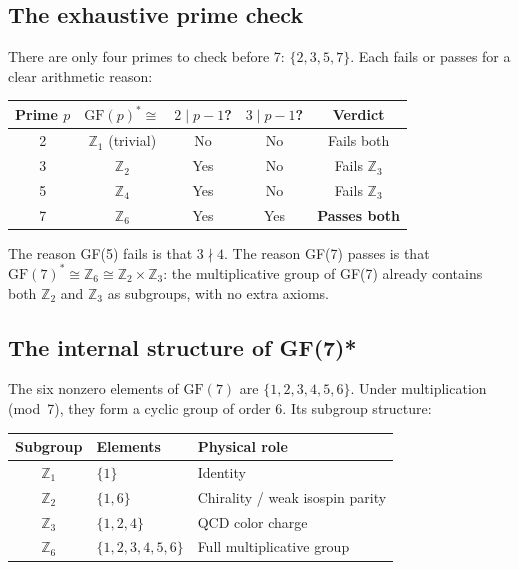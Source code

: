 \documentclass[11pt,a4paper]{article}
\theoremstyle{definition}
\begin{document}
\subsection{The exhaustive prime check}

There are only four primes to check before 7: $\{2, 3, 5, 7\}$.
Each fails or passes for a clear arithmetic reason:

\begin{center}
\begin{tabular}{ccccc}
\toprule
Prime $p$ & $\mathrm{GF}(p)^* \cong$ & $2 \mid p-1$? & $3 \mid p-1$? & Verdict \\
\midrule
2 & $\mathbb{Z}_1$ (trivial) & No  & No  & Fails both \\
3 & $\mathbb{Z}_2$           & Yes & No  & Fails $\mathbb{Z}_3$ \\
5 & $\mathbb{Z}_4$           & Yes & No  & Fails $\mathbb{Z}_3$ \\
7 & $\mathbb{Z}_6$           & Yes & Yes & \textbf{Passes both} \\
\bottomrule
\end{tabular}
\end{center}

\bigskip
The reason GF(5) fails is that $3 \nmid 4$.  The reason GF(7) passes is that
$\mathrm{GF}(7)^* \cong \mathbb{Z}_6 \cong \mathbb{Z}_2 \times \mathbb{Z}_3$:
the multiplicative group of GF(7) already contains both $\mathbb{Z}_2$ and
$\mathbb{Z}_3$ as subgroups, with no extra axioms.

\subsection{The internal structure of GF(7)*}

The six nonzero elements of $\mathrm{GF}(7)$ are $\{1, 2, 3, 4, 5, 6\}$.
Under multiplication (mod~7), they form a cyclic group of order 6.
Its subgroup structure:

\begin{center}
\begin{tabular}{cll}
\toprule
Subgroup & Elements & Physical role \\
\midrule
$\mathbb{Z}_1$ & $\{1\}$ & Identity \\
$\mathbb{Z}_2$ & $\{1, 6\}$ & Chirality / weak isospin parity \\
$\mathbb{Z}_3$ & $\{1, 2, 4\}$ & QCD color charge \\
$\mathbb{Z}_6$ & $\{1, 2, 3, 4, 5, 6\}$ & Full multiplicative group \\
\bottomrule
\end{tabular}
\end{center}
\end{document}
